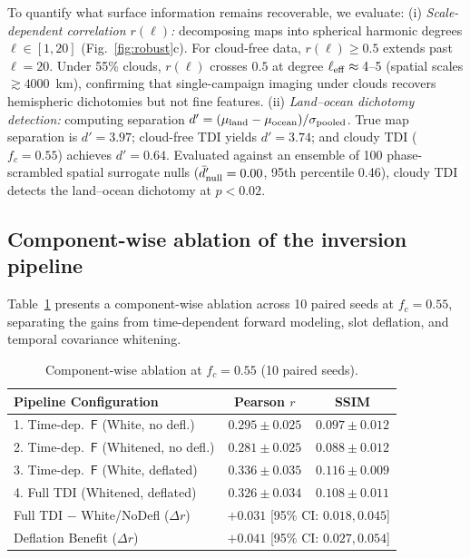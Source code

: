 \documentclass[twocolumn,10pt]{article}
\begin{document}
To quantify what surface information remains recoverable, we evaluate:
(i) {\it Scale-dependent correlation $r(\ell)$:} decomposing maps into spherical
harmonic degrees $\ell\in[1,20]$ (Fig.~\ref{fig:robust}c). For cloud-free data,
$r(\ell)\ge0.5$ extends past $\ell=20$. Under 55\% clouds, $r(\ell)$ crosses
$0.5$ at degree $\ell_{\rm eff}\approx4$--5 (spatial scales $\gtrsim4000$~km),
confirming that single-campaign imaging under clouds recovers hemispheric
dichotomies but not fine features.
(ii) {\it Land--ocean dichotomy detection:} computing separation $d'=(\mu_{\rm land}-\mu_{\rm ocean})/\sigma_{\rm pooled}$.
True map separation is $d'=3.97$; cloud-free TDI yields $d'=3.74$; and cloudy
TDI ($f_c=0.55$) achieves $d'=0.64$. Evaluated against an ensemble of 100
phase-scrambled spatial surrogate nulls ($\bar{d}'_{\rm null}=0.00$, 95th
percentile 0.46), cloudy TDI detects the land--ocean dichotomy at $p<0.02$.

\subsection{Component-wise ablation of the inversion pipeline}
\label{sec:ablation}
Table~\ref{tab:ablation} presents a component-wise ablation across 10 paired
seeds at $f_c=0.55$, separating the gains from time-dependent forward modeling,
slot deflation, and temporal covariance whitening.

\begin{table}[t]
\centering
\caption{Component-wise ablation at $f_c=0.55$ (10 paired seeds).}
\label{tab:ablation}
\footnotesize
\setlength{\tabcolsep}{2.2pt}
\begin{tabular}{lcc}
\toprule
Pipeline Configuration & Pearson $r$ & SSIM \\
\midrule
1. Time-dep.\ $\mathsf{F}$ (White, no defl.)     & $0.295\pm0.025$ & $0.097\pm0.012$ \\
2. Time-dep.\ $\mathsf{F}$ (Whitened, no defl.)  & $0.281\pm0.025$ & $0.088\pm0.012$ \\
3. Time-dep.\ $\mathsf{F}$ (White, deflated)     & $0.336\pm0.035$ & $0.116\pm0.009$ \\
4. Full TDI (Whitened, deflated)                 & $0.326\pm0.034$ & $0.108\pm0.011$ \\
\midrule
Full TDI $-$ White/NoDefl ($\Delta r$)   & \multicolumn{2}{c}{$+0.031$ [95\% CI: $0.018, 0.045$]} \\
Deflation Benefit ($\Delta r$)           & \multicolumn{2}{c}{$+0.041$ [95\% CI: $0.027, 0.054$]} \\
\bottomrule
\end{tabular}
\end{table}
\end{document}
